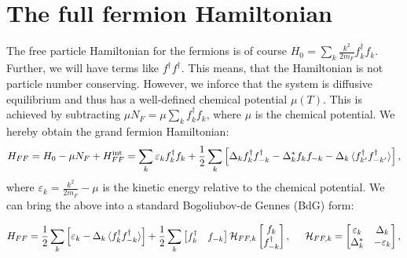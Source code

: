 \section{The full fermion Hamiltonian} \label{sec.HFFfull}
The free particle Hamiltonian for the fermions is of course $H_0 = \sum_k \frac{k^2}{2m_F} f^\dagger_k f_k$. Further, we will have terms like $f^\dagger f^\dagger$. This means, that the Hamiltonian is not particle number conserving. However, we inforce that the system is diffusive equilibrium and thus has a well-defined chemical potential $\mu(T)$. This is achieved by subtracting $\mu N_F = \mu \sum_k f^\dagger_k f_k$, where $\mu$ is the chemical potential. We hereby obtain the grand fermion Hamiltonian:
\begin{equation}
H_{FF} = H_0-\mu N_F + H^\text{int}_{FF} = \sum_k \varepsilon_k f^\dagger_k f_k + \frac{1}{2}\sum_{k} \left[ \Delta_k f^\dagger_k f^\dagger_{-k} - \Delta^*_k f_k f_{-k} - \Delta_k \braket {f^\dagger_{k'}f^\dagger_{-k'}} \right], 
\label{eq.HFFdef}
\end{equation} 
where $\varepsilon_k = \frac{k^2}{2m_F}-\mu$ is the kinetic energy relative to the chemical potential. We can bring the above into a standard Bogoliubov-de Gennes (BdG) form:

\begin{equation}
H_{FF} = \frac{1}{2}\sum_k \left[\varepsilon_k - \Delta_k \braket {f^\dagger_k f^\dagger_{-k}}\right] + \frac{1}{2}\sum_{k} \begin{bmatrix} f_k^\dagger & f_{-k} \end{bmatrix} \mathcal{H}_{FF,k} \begin{bmatrix} f_k \\ f^\dagger_{-k} \end{bmatrix}, \hspace{0.5cm} \mathcal{H}_{FF,k} = \begin{bmatrix} \varepsilon_k & \Delta_k \\ \Delta^*_k & -\varepsilon_k \end{bmatrix}, 
\end{equation}

